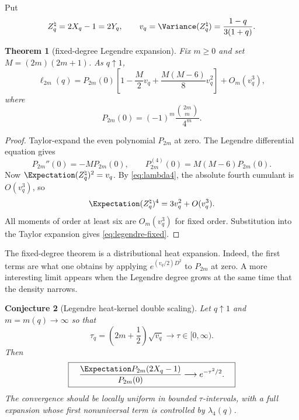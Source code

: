 \documentclass[11pt]{article}
\newtheorem{theorem}{Theorem}[section]
\newtheorem{conjecture}[theorem]{Conjecture}
\theoremstyle{definition}
\theoremstyle{remark}
\begin{document}
Put
\begin{equation}\label{eq:vq}
 Z_q^{\natural}=2X_q-1=2Y_q,
 \qquad
 v_q=\Variance(Z_q^{\natural})=\frac{1-q}{3(1+q)}.
\end{equation}

\begin{theorem}[fixed-degree Legendre expansion]\label{thm:legendre-fixed}
Fix $m\ge0$ and set $M=(2m)(2m+1)$.  As $q\uparrow1$,
\begin{equation}\label{eq:legendre-fixed}
 \ell_{2m}(q)=P_{2m}(0)
 \left[1-\frac{M}{2}v_q+\frac{M(M-6)}8v_q^2\right]
 +O_m(v_q^3),
\end{equation}
where
\begin{equation}\label{eq:P-even-zero}
 P_{2m}(0)=(-1)^m\frac{\binom{2m}{m}}{4^m}.
\end{equation}
\end{theorem}

\begin{proof}
Taylor-expand the even polynomial $P_{2m}$ at zero.  The Legendre differential equation gives
\[
 P_{2m}''(0)=-MP_{2m}(0),
 \qquad
 P_{2m}^{(4)}(0)=M(M-6)P_{2m}(0).
\]
Now $\Expectation(Z_q^{\natural})^2=v_q$.  By \cref{eq:lambda4}, the absolute fourth cumulant is $O(v_q^3)$, so
\[
 \Expectation(Z_q^{\natural})^4=3v_q^2+O(v_q^3).
\]
All moments of order at least six are $O_m(v_q^3)$ for fixed order.  Substitution into the Taylor expansion gives \cref{eq:legendre-fixed}.
\end{proof}

The fixed-degree theorem is a distributional heat expansion.  Indeed, the first terms are what one obtains by applying $e^{(v_q/2)D^2}$ to $P_{2m}$ at zero.  A more interesting limit appears when the Legendre degree grows at the same time that the density narrows.

\begin{conjecture}[Legendre heat-kernel double scaling]\label{conj:legendre-heat}
Let $q\uparrow1$ and $m=m(q)\to\infty$ so that
\begin{equation}\label{eq:tau-legendre}
 \tau_q=\left(2m+\frac12\right)\sqrt{v_q}\longrightarrow\tau\in[0,\infty).
\end{equation}
Then
\begin{equation}\label{eq:legendre-heat}
 \boxed{\quad
 \frac{\Expectation P_{2m}(2X_q-1)}{P_{2m}(0)}
 \longrightarrow e^{-\tau^2/2}.
 \quad}
\end{equation}
The convergence should be locally uniform in bounded $\tau$-intervals, with a full expansion whose first nonuniversal term is controlled by $\lambda_4(q)$.
\end{conjecture}
\end{document}
